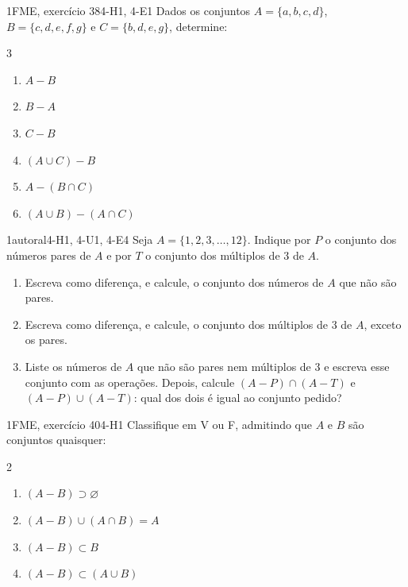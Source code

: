 \Questoes

\begin{questao}{1}{FME, exercício 38}{4-H1, 4-E1}\label{u4:fme38}
Dados os conjuntos $A=\{a,b,c,d\}$, $B=\{c,d,e,f,g\}$ e $C=\{b,d,e,g\}$, determine:
\begin{multicols}{3}
\begin{enumerate}[label=\alph*)]
  \item $A-B$
  \item $B-A$
  \item $C-B$
  \item $(A\cup C)-B$
  \item $A-(B\cap C)$
  \item $(A\cup B)-(A\cap C)$
\end{enumerate}
\end{multicols}
\end{questao}

\begin{questao}{1}{autoral}{4-H1, 4-U1, 4-E4}\label{u4:multiplos}
Seja $A=\{1,2,3,\ldots,12\}$. Indique por $P$ o conjunto dos números pares de $A$ e por $T$ o conjunto dos múltiplos de 3 de $A$.
\begin{enumerate}[label=\alph*)]
  \item Escreva como diferença, e calcule, o conjunto dos números de $A$ que não são pares.
  \item Escreva como diferença, e calcule, o conjunto dos múltiplos de 3 de $A$, exceto os pares.
  \item Liste os números de $A$ que não são pares nem múltiplos de 3 e escreva esse conjunto com as operações. Depois, calcule $(A-P)\cap(A-T)$ e $(A-P)\cup(A-T)$: qual dos dois é igual ao conjunto pedido?
\end{enumerate}
\end{questao}

\begin{questao}{1}{FME, exercício 40}{4-H1}\label{u4:fme40}
Classifique em V ou F, admitindo que $A$ e $B$ são conjuntos quaisquer:
\begin{multicols}{2}
\begin{enumerate}[label=\alph*)]
  \item $(A-B)\supset\varnothing$
  \item $(A-B)\cup(A\cap B)=A$
  \item $(A-B)\subset B$
  \item $(A-B)\subset(A\cup B)$
\end{enumerate}
\end{multicols}
\end{questao}

